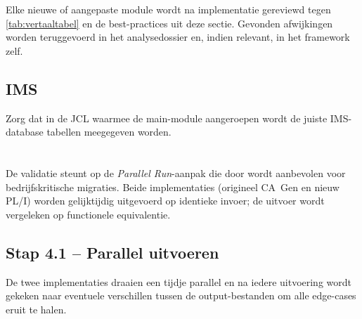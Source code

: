 Elke nieuwe of aangepaste module wordt na implementatie gereviewd tegen \autoref{tab:vertaaltabel} en de 
best-practices uit deze sectie. Gevonden afwijkingen worden teruggevoerd in het analysedossier en, indien 
relevant, in het framework zelf.

\subsection{IMS}
\label{subsec:IMS}

Zorg dat in de JCL waarmee de main-module aangeroepen wordt de juiste IMS-database tabellen meegegeven worden.

\section{}%
\label{sec:component-validatie}

De validatie steunt op de \emph{Parallel Run}-aanpak die door \textcite{Orosz2022} wordt aanbevolen voor 
bedrijfskritische migraties. Beide implementaties (origineel CA~Gen en nieuw PL/I) worden gelijktijdig 
uitgevoerd op identieke invoer; de uitvoer wordt vergeleken op functionele equivalentie.

\subsection{Stap 4.1 -- Parallel uitvoeren}
\label{subsec:parallel-run}

De twee implementaties draaien een tijdje parallel en na iedere uitvoering wordt gekeken naar eventuele verschillen tussen de output-bestanden om alle edge-cases eruit te halen.



\section{}%
\label{sec:framework-herbruikbaarheid}

